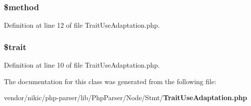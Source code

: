 \subsubsection[{\$method}]{\setlength{\rightskip}{0pt plus 5cm}\$method}\label{class_php_parser_1_1_node_1_1_stmt_1_1_trait_use_adaptation_a12661b2fc0f57f97e30a1620889ce9c6}


Definition at line 12 of file Trait\+Use\+Adaptation.\+php.

\subsubsection[{\$trait}]{\setlength{\rightskip}{0pt plus 5cm}\$trait}\label{class_php_parser_1_1_node_1_1_stmt_1_1_trait_use_adaptation_a6982aeba4efdb2de818dae6e770b07d4}


Definition at line 10 of file Trait\+Use\+Adaptation.\+php.



The documentation for this class was generated from the following file\+:\begin{DoxyCompactItemize}
\item 
vendor/nikic/php-\/parser/lib/\+Php\+Parser/\+Node/\+Stmt/{\bf Trait\+Use\+Adaptation.\+php}\end{DoxyCompactItemize}
